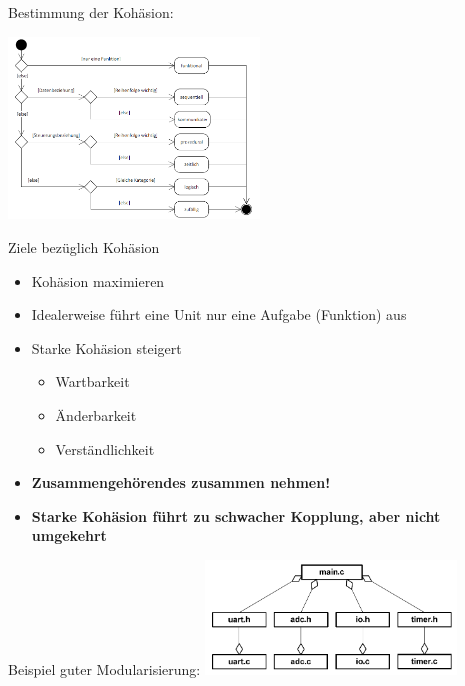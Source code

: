 Bestimmung der Kohäsion:
\begin{center}
{\includegraphics[width=0.5\textwidth]{images/Modularisierung/Kohaesionsbestimmung.png}}
\end{center}
Ziele bezüglich Kohäsion
\begin{itemize}
  \item Kohäsion maximieren
  \item Idealerweise führt eine Unit nur eine Aufgabe (Funktion) aus
  \item Starke Kohäsion steigert
  \begin{itemize}
    \item Wartbarkeit
    \item Änderbarkeit
    \item Verständlichkeit
  \end{itemize}
  \item \textbf{Zusammengehörendes zusammen nehmen!}
  \item \textbf{Starke Kohäsion führt zu schwacher Kopplung, aber nicht umgekehrt}
\end{itemize}
\begin{center}
Beispiel guter Modularisierung:
{\includegraphics[width=0.5\textwidth]{images/Modularisierung/GutesBeispielModularisierung.png}}
\end{center}